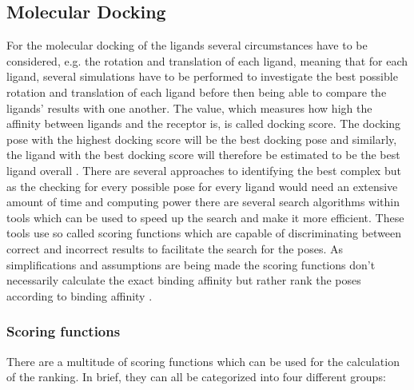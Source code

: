 \documentclass[11pt, letterpaper, titlepage]{article}
\begin{document}
  

  

  

\subsection{Molecular Docking} 

For the molecular docking of the ligands several circumstances have to be considered, e.g. the rotation and translation of each ligand, meaning that for each ligand, several simulations have to be performed to investigate the best possible rotation and translation of each ligand before then being able to compare the ligands’ results with one another. The value, which measures how high the affinity between ligands and the receptor is, is called docking score. The docking pose with the highest docking score will be the best docking pose and similarly, the ligand with the best docking score will therefore be estimated to be the best ligand overall \cite{AlKarmalawy2021}. 
\newline \newline
There are several approaches to identifying the best complex but as the checking for every possible pose for every ligand would need an extensive amount of time and computing power there are several search algorithms within tools which can be used to speed up the search and make it more efficient. These tools use so called scoring functions which are capable of discriminating between correct and incorrect results to facilitate the search for the poses. As simplifications and assumptions are being made the scoring functions don’t necessarily calculate the exact binding affinity but rather rank the poses according to binding affinity \cite{Guedes2018}.

 

\subsubsection{Scoring functions} 

There are a multitude of scoring functions which can be used for the calculation of the ranking. In brief, they can all be categorized into four different groups: 
\end{document}
